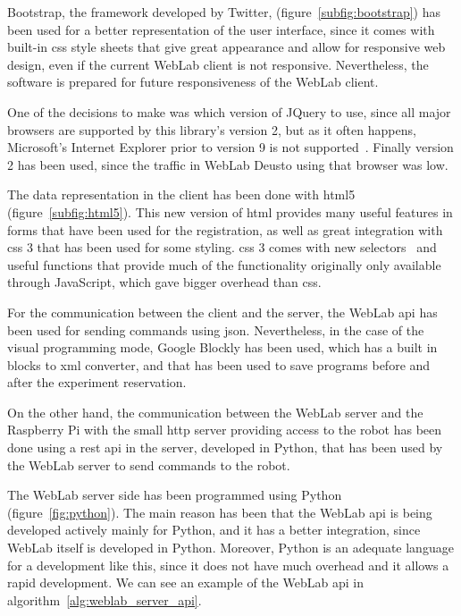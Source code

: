 Bootstrap, the framework developed by Twitter, (figure~\ref{subfig:bootstrap}) has been used for a
better representation of the user interface, since it comes with built-in \acrshort{css} style
sheets that give great appearance and allow for responsive web design, even if the current WebLab
client is not responsive. Nevertheless, the software is prepared for future responsiveness of the
WebLab client.

One of the decisions to make was which version of JQuery to use, since all major browsers are
supported by this library's version 2, but as it often happens, Microsoft's Internet Explorer prior
to version 9 is not supported~\cite{jquery_versions}. Finally version 2 has been used, since the
traffic in WebLab Deusto using that browser was low.

The data representation in the client has been done with \acrshort{html}5~\cite{html5_spec}
(figure~\ref{subfig:html5}). This new version of \acrshort{html} provides many useful features in
forms that have been used for the registration, as well as great integration with \acrshort{css} 3
that has been used for some styling. \acrshort{css} 3 comes with new selectors~\cite{css3_sel} and
useful functions that provide much of the functionality originally only available through
JavaScript, which gave bigger overhead than \acrshort{css}.

For the communication between the client and the server, the WebLab \acrshort{api} has been used for
sending commands using \acrshort{json}. Nevertheless, in the case of the visual programming mode,
Google Blockly has been used, which has a built in blocks to \acrshort{xml} converter, and that has
been used to save programs before and after the experiment reservation.

On the other hand, the communication between the WebLab server and the Raspberry Pi with the small
\acrshort{http} server providing access to the robot has been done using a \acrshort{rest}
\acrshort{api} in the server, developed in Python, that has been used by the WebLab server to send
commands to the robot.

The WebLab server side has been programmed using Python (figure~\ref{fig:python}). The main reason
has been that the WebLab \acrshort{api} is being developed actively mainly for Python, and it has
a better integration, since WebLab itself is developed in Python. Moreover, Python is an adequate
language for a development like this, since it does not have much overhead and it allows a rapid
development. We can see an example of the WebLab \acrshort{api} in
algorithm~\ref{alg:weblab_server_api}.

